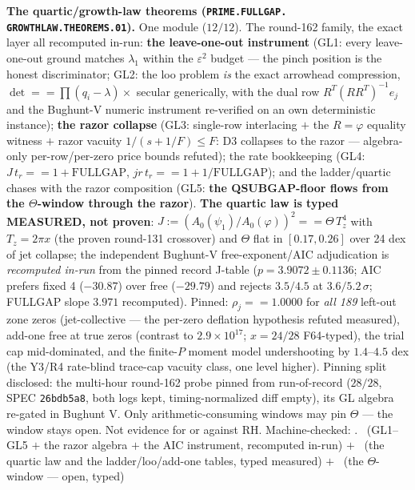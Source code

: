 \documentclass[11pt,a4paper]{article}
\theoremstyle{definition}
\begin{document}
\par\smallskip\noindent\textbf{The quartic/growth-law theorems
(\texttt{PRIME.\allowbreak FULLGAP.\allowbreak
GROWTHLAW.\allowbreak THEOREMS.01}).}
One module ($12/12$).  The round-162 family, the exact layer all
recomputed in-run: \textbf{the leave-one-out instrument} (GL1:
every leave-one-out ground matches $\lambda_1$ within the
$\varepsilon^2$ budget --- the pinch position is the honest
discriminator; GL2: the loo problem \emph{is} the exact arrowhead
compression, $\det == \prod(q_i - \lambda) \times$ secular
generically, with the dual row $R^T(RR^T)^{-1}e_j$ and the
Bughunt-V numeric instrument re-verified on an own deterministic
instance); \textbf{the razor collapse} (GL3: single-row
interlacing $+$ the $R = \varphi$ equality witness $+$ razor
vacuity $1/(s + 1/F) \le F$: D3 collapses to the razor ---
algebra-only per-row/per-zero price bounds refuted); the rate
bookkeeping (GL4: $J\,t_r == 1 + \mathrm{FULLGAP}$, $jr\,t_r ==
1 + 1/\mathrm{FULLGAP}$); and the ladder/quartic chases with the
razor composition (GL5: \textbf{the QSUBGAP-floor flows from the
$\Theta$-window through the razor}).  \textbf{The quartic law is
typed MEASURED, not proven}: $J := (A_0(\psi_1)/A_0(\varphi))^2
== \Theta\,T_z^4$ with $T_z = 2\pi x$ (the proven round-131
crossover) and $\Theta$ flat in $[0.17, 0.26]$ over 24 dex of
jet collapse; the independent Bughunt-V free-exponent/AIC
adjudication is \emph{recomputed in-run} from the pinned record
J-table ($p = 3.9072 \pm 0.1136$; AIC prefers fixed 4 ($-30.87$)
over free ($-29.79$) and rejects $3.5/4.5$ at $3.6/5.2\,\sigma$;
FULLGAP slope $3.971$ recomputed).  Pinned: $\rho_j == 1.0000$
for \emph{all 189} left-out zone zeros (jet-collective --- the
per-zero deflation hypothesis refuted measured), add-one free at
true zeros (contrast to $2.9\times10^{17}$; $x = 24/28$
F64-typed), the trial cap mid-dominated, and the finite-$P$
moment model undershooting by $1.4$--$4.5$ dex (the Y3/R4
rate-blind trace-cap vacuity class, one level higher).  Pinning
split disclosed: the multi-hour round-162 probe pinned from
run-of-record ($28/28$, SPEC \texttt{26bdb5a8}, both logs kept,
timing-normalized diff empty), its GL algebra re-gated in
Bughunt V.  Only arithmetic-consuming windows may pin $\Theta$
--- the window stays open.  Not evidence for or against RH.
Machine-checked: .
\mE\ (GL1--GL5 $+$ the razor algebra $+$ the AIC instrument,
recomputed in-run) $+$ \mC\ (the quartic law and the
ladder/loo/add-one tables, typed measured) $+$ \mO\ (the
$\Theta$-window --- open, typed)
\par\smallskip
\end{document}
